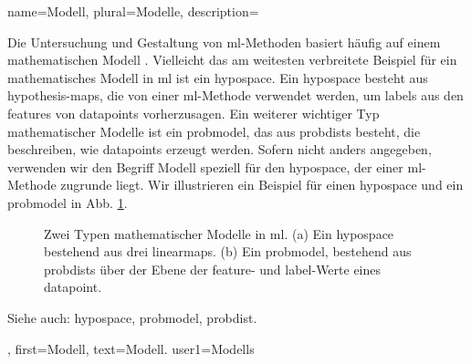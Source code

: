{{{{
{
name={Modell}, plural={Modelle}, 
description={Die Untersuchung und Gestaltung von \gls{ml}-Methoden basiert häufig auf einem mathematischen Modell \cite{bender1978mathematical}. 
Vielleicht das am weitesten verbreitete Beispiel für ein mathematisches Modell in \gls{ml} ist ein \gls{hypospace}. 
Ein \gls{hypospace} besteht aus \gls{hypothesis}-\glspl{map}, die von einer \gls{ml}-Methode verwendet werden, um \glspl{label} aus den \glspl{feature} von \glspl{datapoint} vorherzusagen. Ein weiterer wichtiger Typ mathematischer Modelle ist ein \gls{probmodel}, das aus \glspl{probdist} besteht, die beschreiben, wie \glspl{datapoint} erzeugt werden. Sofern nicht anders angegeben, verwenden wir den Begriff Modell speziell für den \gls{hypospace}, der einer \gls{ml}-Methode zugrunde liegt. Wir illustrieren ein Beispiel für einen \gls{hypospace} und ein \gls{probmodel} in Abb. \ref{fig_model_dict}.
\begin{figure}[H]
\centering
{}
\hspace{2cm}
\caption{Zwei Typen mathematischer Modelle in \gls{ml}. (a) Ein \gls{hypospace} bestehend aus drei \glspl{linearmap}. (b) Ein \gls{probmodel}, bestehend aus \glspl{probdist} über der Ebene der \gls{feature}- und \gls{label}-Werte eines \gls{datapoint}. \label{fig_model_dict}}
\end{figure}
Siehe auch: \gls{hypospace}, \gls{probmodel}, \gls{probdist}.
},
first={Modell},
text={Modell}.
user1={Modells}
}

}}}}
